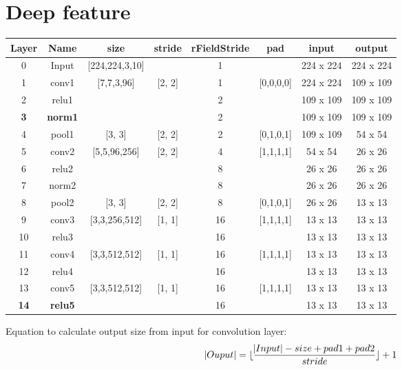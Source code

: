 \documentclass[12pt]{article}
\numberwithin{equation}{section}
\begin{document}
\section{Deep feature \citep{chatfield2014return}}
	\begin{table}[h!]
  		\centering
  		\begin{tabular}{c|c|c|c|c|c|c|c}
   			Layer & Name & size & stride&rFieldStride& pad        & input         & output\\
   			\hline
			0        & Input   &[224,224,3,10]&           &1&              & 224 x 224 & 224 x 224\\ 
			1        & conv1 & [7,7,3,96]       &[2, 2]   &1& [0,0,0,0] & 224 x 224 & 109 x 109\\ 
			2        & relu1   &                       &            &2&               & 109 x 109 & 109 x 109\\ 
	     \textbf{3}  & \textbf{norm1} &                       &           &2&                & 109 x 109 & 109 x 109\\ 
			4        & pool1  & [3, 3]              & [2, 2]   &2& [0,1,0,1]  & 109 x 109  & 54 x 54\\ 
			5        & conv2 & [5,5,96,256]   & [2, 2]   &4&[1,1,1,1]   &  54 x 54    & 26 x 26 \\ 
			6        & relu2   &                       &            &8&                &  26 x 26 &  26 x 26\\ 
			7        & norm2 &                       &            &8&                &  26 x 26 &  26 x 26\\ 
			8        & pool2  & [3, 3]              & [2, 2]   &8& [0,1,0,1]  &  26 x 26 & 13 x 13\\ 
			9        & conv3 & [3,3,256,512] & [1, 1]   &16&[1,1,1,1]   & 13 x 13 & 13 x 13\\ 
			10      & relu3   &                       &            &16&                & 13 x 13 & 13 x 13\\
			11      & conv4 & [3,3,512,512]  & [1, 1]  &16&[1,1,1,1]   & 13 x 13 & 13 x 13\\ 
			12      & relu4   &             		&          &16&                 & 13 x 13 & 13 x 13\\ 
			13      & conv5 & [3,3,512,512]  & [1, 1] &16&[1,1,1,1]    & 13 x 13 & 13 x 13\\ 
	     \textbf{14} & \textbf{relu5}   &                        &          &16&                 & 13 x 13 & 13 x 13\\  
  		\end{tabular}
	\end{table} \par
Equation to calculate output size from input for convolution layer:
\begin{equation}
	\abs{Ouput} = \lfloor{\frac{\abs{Input} - size + pad1 + pad2}{stride}}\rfloor + 1
\end{equation}	
\end{document}
